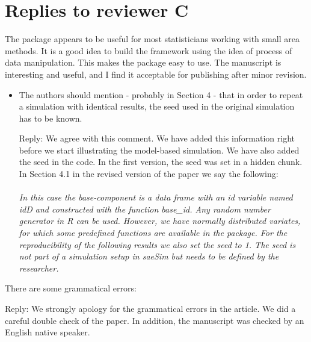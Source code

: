 \documentclass[11pt]{article}
\begin{document}
\pagebreak
\section*{Replies to reviewer C}

The package appears to be useful for most statisticians working with small area methods. It is a good idea to build the framework using the idea of process of data manipulation. This makes the package easy to use. The manuscript is interesting and useful, and I find it acceptable for
publishing after minor revision.

\begin{itemize}
\item
	The authors should mention - probably in Section 4 - that in order to repeat a simulation with identical results, the seed used in the original simulation has to be known.
	
	Reply: We agree with this comment. We have added this information right before we start illustrating the model-based simulation. We have also added the seed in the code. In the first version, the seed was set in a hidden chunk. In Section 4.1 in the revised version of the paper we say the following:\\\\
	\textit{In this case the \textit{base-component} is a data frame with an id variable named idD and constructed with the function base\_id. Any random number generator in R can be used. However, we have normally distributed variates, for which some predefined functions are available in the package. For the reproducibility of the following results we also set the seed to 1. The seed is not part of a simulation setup in saeSim but needs to be defined by the researcher.}
	
\end{itemize}

\vspace{0.5cm}

\noindent There are some grammatical errors:

\noindent Reply: We strongly apology for the grammatical errors in the article. We did a careful double check of the paper. In addition, the manuscript was checked by an English native speaker.
\end{document}
